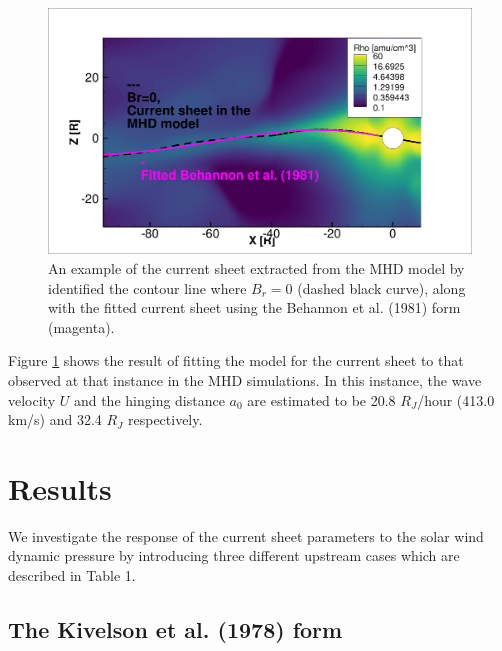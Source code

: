 \begin{figure}
    \centering
    \includegraphics[width=\textwidth]{images6/CurrentSheet_fitted.png}
    \caption{An example of the current sheet extracted from the MHD model  by identified the contour line where $B_r=0$ (dashed black curve), along with the fitted current sheet using the Behannon et al. (1981) form (magenta).}
    \label{fig:example-fitcurrentsheet}
\end{figure}

Figure \ref{fig:example-fitcurrentsheet} shows the result of fitting the  model for the current sheet to that observed at that instance in the MHD simulations. In this instance, the wave velocity $U$ and the hinging distance $a_0$ are estimated to be 20.8 $R_J$/hour (413.0 km/s) and 32.4 $R_J$ respectively. 

\section{Results}

We investigate the response of the current sheet parameters to the solar wind dynamic pressure by introducing three different upstream cases which are described in Table 1. 

\subsection{The Kivelson et al. (1978) form}

